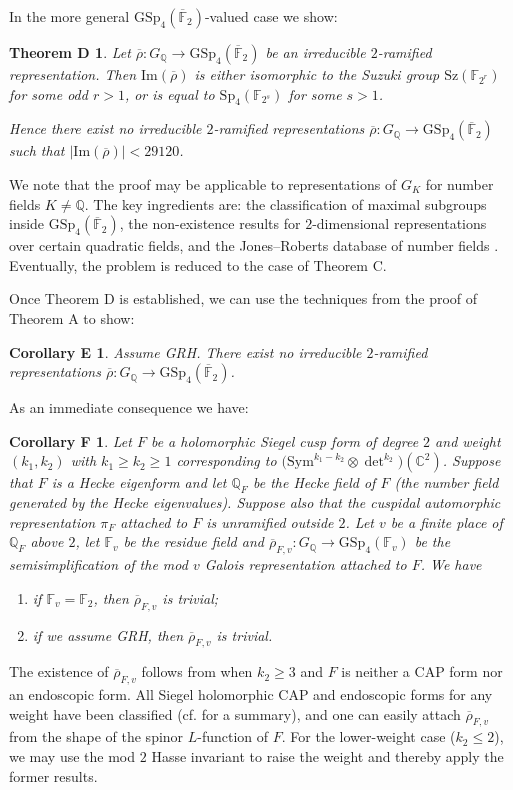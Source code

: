 \documentclass{amsart}
\newtheorem*{theoremD}{Theorem D}
\newtheorem*{corE}{Corollary E}
\newtheorem*{corF}{Corollary F}
\theoremstyle{definition}
\newcommand{\lra}{\longrightarrow}
\newcommand{\C}{\mathbb{C}}
\newcommand{\Q}{\mathbb{Q}}
\newcommand{\F}{\mathbb{F}}
\newcommand{\bF}{\overline{\F}}
\newcommand{\br}{\overline{\rho}}
\newcommand{\GSp}{\mathrm{GSp}}
\newcommand{\Sp}{\mathrm{Sp}}
\newcommand{\Sz}{\mathrm{Sz}}
\newcommand{\Sym}{\mathrm{Sym}}
\newcommand{\im}{\mathrm{Im}}
\renewcommand{\geq}{\geqslant}
\renewcommand{\ge}{\geqslant}
\renewcommand{\le}{\leqslant}
\begin{document}
In the more general $\GSp_4(\bF_2)$-valued case we show:
\begin{theoremD}
  Let $\br:G_\Q\lra \GSp_4(\bF_2)$ be an irreducible $2$-ramified representation.
  Then $\im(\br)$ is either isomorphic to the Suzuki group $\Sz(\F_{2^r})$ for some odd $r>1$, or is equal to $\Sp_4(\F_{2^s})$ for some $s>1$.

  Hence there exist no irreducible $2$-ramified representations $\br:G_\Q\lra \GSp_4(\bF_2)$ such that $|\im(\br)|<29120$.
\end{theoremD}
We note that the proof may be applicable to representations of $G_K$ for number fields $K\neq\Q$.
The key ingredients are: the classification of maximal subgroups inside $\GSp_4(\bF_2)$, the non-existence results for $2$-dimensional representations over certain quadratic fields, and the Jones--Roberts database of number fields \cite{JR}.
Eventually, the problem is reduced to the case of Theorem C.

Once Theorem D is established, we can use the techniques from the proof of Theorem A to show:
\begin{corE}
  Assume GRH.
  There exist no irreducible $2$-ramified representations $\br:G_\Q\lra \GSp_4(\bF_2)$.
\end{corE}

As an immediate consequence we have:
\begin{corF}
  Let $F$ be a holomorphic Siegel cusp form of degree $2$ and weight $(k_1,k_2)$ with $k_1\ge k_2\geq 1$ corresponding to $\big(\Sym^{k_1-k_2}\otimes\det^{k_2}\big)(\C^2)$.
  Suppose that $F$ is a Hecke eigenform and let $\Q_F$ be the Hecke field of $F$ (the number field generated by the Hecke eigenvalues).
  Suppose also that the cuspidal automorphic representation $\pi_F$ attached to $F$ is unramified outside $2$.
  Let $v$ be a finite place of $\Q_F$ above $2$, let $\F_v$ be the residue field and $\br_{F,v}:G_\Q\lra\GSp_4(\F_v)$ be the semisimplification of the mod $v$ Galois representation attached to $F$.
  We have
  \begin{enumerate}
    \item if $\F_v=\F_2$, then $\br_{F,v}$ is trivial;
    \item if we assume GRH, then $\br_{F,v}$ is trivial.
  \end{enumerate}
\end{corF}
The existence of $\br_{F,v}$ follows from \cite{Wei} when $k_2 \ge 3$ and $F$ is neither a CAP form nor an endoscopic form.
All Siegel holomorphic CAP and endoscopic forms for any weight have been classified (cf. \cite[Sections 3.4 and 3.5]{KWY} for a summary), and one can easily attach $\br_{F,v}$ from the shape of the spinor $L$-function of $F$.
For the lower-weight case ($k_2 \le 2$), we may use the mod $2$ Hasse invariant to raise the weight and thereby apply the former results.
\end{document}
